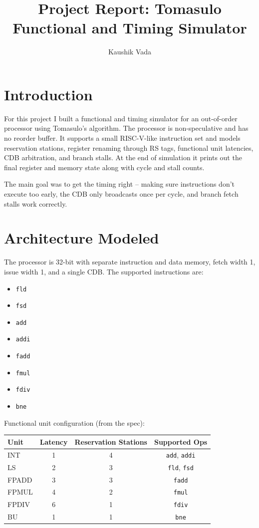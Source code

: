 \documentclass[11pt]{article}
\title{Project Report: Tomasulo Functional and Timing Simulator}
\author{Kaushik Vada}
\date{}
\begin{document}
\maketitle

\section{Introduction}
For this project I built a functional and timing simulator for an out-of-order processor using Tomasulo's algorithm. The processor is non-speculative and has no reorder buffer. It supports a small RISC-V-like instruction set and models reservation stations, register renaming through RS tags, functional unit latencies, CDB arbitration, and branch stalls. At the end of simulation it prints out the final register and memory state along with cycle and stall counts.

The main goal was to get the timing right -- making sure instructions don't execute too early, the CDB only broadcasts once per cycle, and branch fetch stalls work correctly.

\section{Architecture Modeled}
The processor is 32-bit with separate instruction and data memory, fetch width 1, issue width 1, and a single CDB. The supported instructions are:

\begin{itemize}
\item \texttt{fld}
\item \texttt{fsd}
\item \texttt{add}
\item \texttt{addi}
\item \texttt{fadd}
\item \texttt{fmul}
\item \texttt{fdiv}
\item \texttt{bne}
\end{itemize}

Functional unit configuration (from the spec):

\begin{center}
\begin{tabular}{lccc}
\toprule
Unit & Latency & Reservation Stations & Supported Ops \\
\midrule
INT & 1 & 4 & \texttt{add}, \texttt{addi} \\
LS & 2 & 3 & \texttt{fld}, \texttt{fsd} \\
FPADD & 3 & 3 & \texttt{fadd} \\
FPMUL & 4 & 2 & \texttt{fmul} \\
FPDIV & 6 & 1 & \texttt{fdiv} \\
BU & 1 & 1 & \texttt{bne} \\
\bottomrule
\end{tabular}
\end{center}
\end{document}
